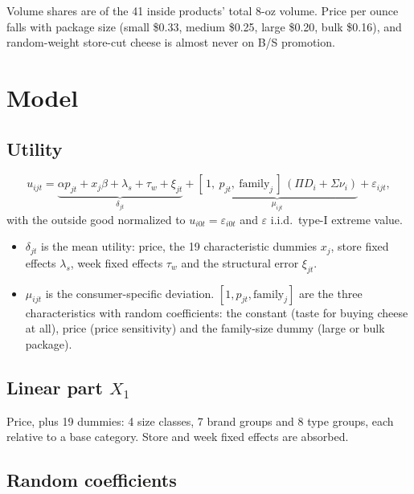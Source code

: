 \documentclass[11pt]{article}
\newcommand{\family}{\text{family}}
\begin{document}
Volume shares are of the 41 inside products' total 8-oz volume. Price per ounce falls with
package size (small \$0.33, medium \$0.25, large \$0.20, bulk \$0.16), and random-weight
store-cut cheese is almost never on B/S promotion.

\section{Model}\label{sec:model}

\subsection{Utility}\label{sec:utility}

\begin{equation}\label{eq:utility}
u_{ijt} = \underbrace{\alpha p_{jt} + x_j\beta + \lambda_s + \tau_w + \xi_{jt}}_{\delta_{jt}}
+ \underbrace{[\,1,\ p_{jt},\ \family_j\,]\,(\Pi D_i + \Sigma\nu_i)}_{\mu_{ijt}}
+ \varepsilon_{ijt},
\end{equation}
with the outside good normalized to $u_{i0t} = \varepsilon_{i0t}$ and $\varepsilon$ i.i.d.\
type-I extreme value.

\begin{itemize}
  \item $\delta_{jt}$ is the mean utility: price, the 19 characteristic dummies $x_j$, store
        fixed effects $\lambda_s$, week fixed effects $\tau_w$ and the structural error
        $\xi_{jt}$.
  \item $\mu_{ijt}$ is the consumer-specific deviation. $[1, p_{jt}, \family_j]$ are the three
        characteristics with random coefficients: the constant (taste for buying cheese at
        all), price (price sensitivity) and the family-size dummy (large or bulk package).
\end{itemize}

\subsection{Linear part $X_1$}\label{sec:x1}

Price, plus 19 dummies: 4 size classes, 7 brand groups and 8 type groups, each relative to a
base category. Store and week fixed effects are absorbed.

\subsection{Random coefficients}\label{sec:rc}
\end{document}
